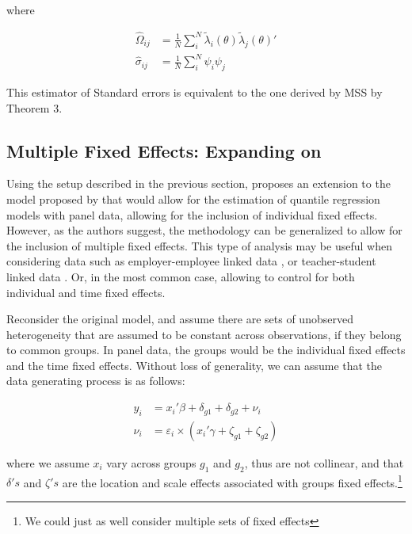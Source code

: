 \documentclass[
  authoryear,
  review,
  1p]{elsarticle}
\begin{document}
where

\[\begin{aligned}
\hat\Omega_{ij} &= \frac{1}{N} \sum_i^N \tilde \lambda_{i}(\theta) \tilde \lambda_{j}(\theta)' \\
\hat\sigma_{ij} &= \frac{1}{N} \sum_i^N \psi_{i} \psi_{j}
\end{aligned}
\]

This estimator of Standard errors is equivalent to the one derived by
MSS by Theorem 3.

\subsection{\texorpdfstring{Multiple Fixed Effects: Expanding on
\citet{mss2019}}{Multiple Fixed Effects: Expanding on @mss2019}}\label{multiple-fixed-effects-expanding-on-mss2019}

Using the setup described in the previous section, \citet{mss2019}
proposes an extension to the model proposed by \citet{he1997} that would
allow for the estimation of quantile regression models with panel data,
allowing for the inclusion of individual fixed effects. However, as the
authors suggest, the methodology can be generalized to allow for the
inclusion of multiple fixed effects. This type of analysis may be useful
when considering data such as employer-employee linked data
\citep{abowed2006}, or teacher-student linked data
\citep{harrissass2011}. Or, in the most common case, allowing to control
for both individual and time fixed effects.

Reconsider the original model, and assume there are sets of unobserved
heterogeneity that are assumed to be constant across observations, if
they belong to common groups. In panel data, the groups would be the
individual fixed effects and the time fixed effects. Without loss of
generality, we can assume that the data generating process is as
follows:

\[\begin{aligned}
  y_{i} &= x_{i}' \beta + \delta_{g1} + \delta_{g2} + \nu_i \\
  \nu_i &= \varepsilon_i \times (x_{i}' \gamma + \zeta_{g1} + \zeta_{g2})   
  \end{aligned}
\]

where we assume \(x_{i}\) vary across groups \(g_1\) and \(g_2\), thus
are not collinear, and that \(\delta's\) and \(\zeta's\) are the
location and scale effects associated with groups fixed
effects.\footnote{We could just as well consider multiple sets of fixed
  effects}
\end{document}
